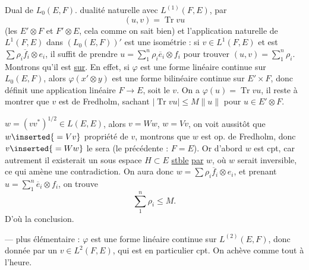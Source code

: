 Dual de $L_0(E,F)$.   dualité \deleted{\unsure{\ldots}} naturelle avec $L^{(1)}(F,E)$,  par
\[
\boxed{(u,v)=\operatorname{Tr}vu}
\]
(les $E'\otimes F$ et $F'\otimes E$, cela comme on sait bien)
et l'application naturelle de $L^1(F,E)$ dans $(L_0(E,F))'$ est une isométrie : si $v\in L^1(F,E)$ et est $\sum\rho_i\overline f_i\otimes e_i$, il suffit de prendre $u=\sum_1^n\rho_i\overline e_i\otimes f_i$ pour trouver $(u,v)=\sum_1^n\rho_i$.
Montrons qu'il est \uline{sur}. En effet, si $\varphi$ est une forme linéaire continue sur $L_0(E,F)$, alors $\varphi(x'\otimes y)$ est une forme bilinéaire continue sur $E'\times F$, donc définit une application linéaire $F\longrightarrow E$, soit le $v$. On a $\varphi(u)=\operatorname{Tr}vu$, il reste à montrer que $v$ est de Fredholm, sachant $|\operatorname{Tr}vu|\leq M\|u\|$ pour $u\in E'\otimes F$.


$w=(vv^*)^{1/2}\in L(E,E)$, alors $v=Ww$, $w=Vv$, on voit aussitôt que $w\inserted{{}=Vv}$  propriété de $v$, montrons que $w$ est op. de Fredholm, donc $v\inserted{{}=Ww}$ le sera (le précédente : $F=E$).
Or  d'abord $w$ est cpt, car autrement il existerait un sous espace $H\subset E$ \uline{stble}  \uline{par}  $w$, où $w$ serait inversible, ce qui amène une contradiction.
On aura donc $w=\sum\rho_i\overline f_i\otimes e_i$, et prenant $u=\sum_1^n\overline e_i\otimes f_i$, on trouve
\[
\sum_1^n\rho_i\leq M.
\]
D'où la conclusion.

---   plus élémentaire : $\varphi$ est une forme linéaire continue sur $L^{(2)}(E,F)$, donc donnée par un $v\in L^2(F,E)$, qui est en particulier cpt. On achève comme tout à l'heure.
